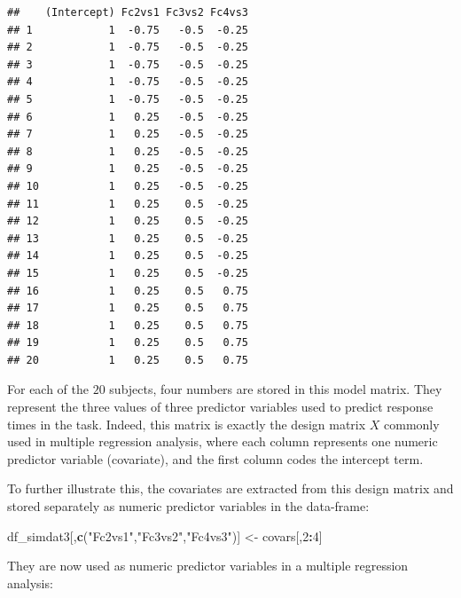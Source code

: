 \documentclass[12pt,]{krantz}
\newenvironment{Shaded}{\begin{snugshade}}{\end{snugshade}}
\newcommand{\DecValTok}[1]{\textcolor[rgb]{0.00,0.00,0.81}{#1}}
\newcommand{\KeywordTok}[1]{\textcolor[rgb]{0.13,0.29,0.53}{\textbf{#1}}}
\newcommand{\NormalTok}[1]{#1}
\newcommand{\OperatorTok}[1]{\textcolor[rgb]{0.81,0.36,0.00}{\textbf{#1}}}
\newcommand{\StringTok}[1]{\textcolor[rgb]{0.31,0.60,0.02}{#1}}
\theoremstyle{definition}
\theoremstyle{definition}
\theoremstyle{definition}
\theoremstyle{remark}
\begin{document}
\begin{verbatim}
##    (Intercept) Fc2vs1 Fc3vs2 Fc4vs3
## 1            1  -0.75   -0.5  -0.25
## 2            1  -0.75   -0.5  -0.25
## 3            1  -0.75   -0.5  -0.25
## 4            1  -0.75   -0.5  -0.25
## 5            1  -0.75   -0.5  -0.25
## 6            1   0.25   -0.5  -0.25
## 7            1   0.25   -0.5  -0.25
## 8            1   0.25   -0.5  -0.25
## 9            1   0.25   -0.5  -0.25
## 10           1   0.25   -0.5  -0.25
## 11           1   0.25    0.5  -0.25
## 12           1   0.25    0.5  -0.25
## 13           1   0.25    0.5  -0.25
## 14           1   0.25    0.5  -0.25
## 15           1   0.25    0.5  -0.25
## 16           1   0.25    0.5   0.75
## 17           1   0.25    0.5   0.75
## 18           1   0.25    0.5   0.75
## 19           1   0.25    0.5   0.75
## 20           1   0.25    0.5   0.75
\end{verbatim}

For each of the \(20\) subjects, four numbers are stored in this model matrix. They represent the three values of three predictor variables used to predict response times in the task. Indeed, this matrix is exactly the design matrix \(X\) commonly used in multiple regression analysis, where each column represents one numeric predictor variable (covariate), and the first column codes the intercept term.

To further illustrate this, the covariates are extracted from this design matrix and stored separately as numeric predictor variables in the data-frame:

\begin{Shaded}
\begin{Highlighting}[]
\NormalTok{df_simdat3[,}\KeywordTok{c}\NormalTok{(}\StringTok{"Fc2vs1"}\NormalTok{,}\StringTok{"Fc3vs2"}\NormalTok{,}\StringTok{"Fc4vs3"}\NormalTok{)] <-}\StringTok{ }\NormalTok{covars[,}\DecValTok{2}\OperatorTok{:}\DecValTok{4}\NormalTok{]}
\end{Highlighting}
\end{Shaded}

They are now used as numeric predictor variables in a multiple regression analysis:
\end{document}
